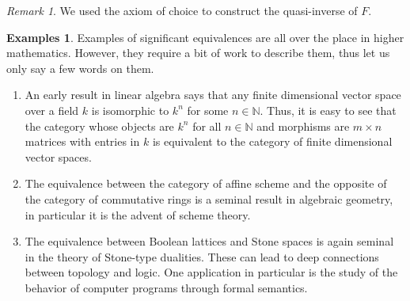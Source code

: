 \documentclass{article}
\theoremstyle{definition}
\newtheorem{exmps}[thm]{Examples}
\theoremstyle{remark}
\newtheorem{rem}[thm]{Remark}
\newcommand{\N}{\mathbb{N}}
\begin{document}
\begin{rem} We used the axiom of choice to construct the quasi-inverse of $F$.
\end{rem}

\begin{exmps} Examples of significant equivalences are all over the place in higher mathematics. However, they require a bit of work to describe them, thus let us only say a few words on them.
	\begin{enumerate}
		\item An early result in linear algebra says that any finite dimensional vector space over a field $k$ is isomorphic to $k^n$ for some $n\in \N$. Thus, it is easy to see that the category whose objects are $k^n$ for all $n\in \N$ and morphisms are $m\times n$ matrices with entries in $k$ is equivalent to the category of finite dimensional vector spaces.
		\item The equivalence between the category of affine scheme and the opposite of the category of commutative rings is a seminal result in algebraic geometry, in particular it is the advent of scheme theory.
		\item The equivalence between Boolean lattices and Stone spaces is again seminal in the theory of Stone-type dualities. These can lead to deep connections between topology and logic. One application in particular is the study of the behavior of computer programs through formal semantics.
	\end{enumerate}
\end{exmps}
\end{document}
